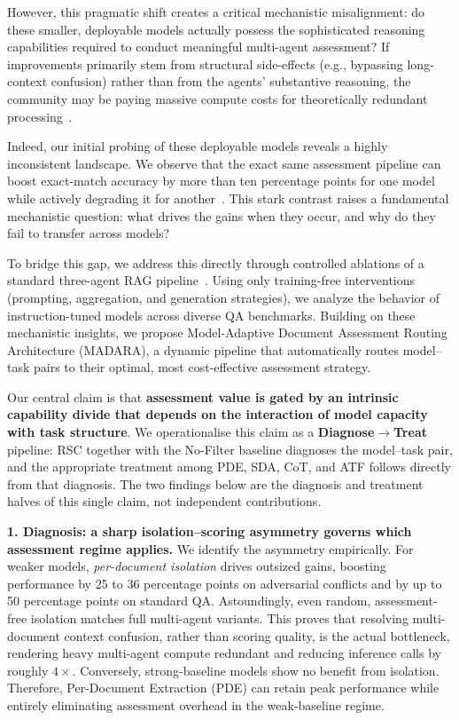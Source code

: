 \documentclass[11pt]{article}
\theoremstyle{definition}
\begin{document}
However, this pragmatic shift creates a critical mechanistic misalignment: do these smaller, deployable models actually possess the sophisticated reasoning capabilities required to conduct meaningful multi-agent assessment? If improvements primarily stem from structural side-effects (e.g., bypassing long-context confusion) rather than from the agents' substantive reasoning, the community may be paying massive compute costs for theoretically redundant processing~\cite{liu2024lost}.

Indeed, our initial probing of these deployable models reveals a highly inconsistent landscape. We observe that the exact same assessment pipeline can boost exact-match accuracy by more than ten percentage points for one model while actively degrading it for another~\cite{luo2025zero, gao2026u, du2025context}. This stark contrast raises a fundamental mechanistic question: what drives the gains when they occur, and why do they fail to transfer across models?


To bridge this gap, we address this directly through controlled ablations of a standard three-agent RAG pipeline~\citep{chang2025main}. Using only training-free interventions (prompting, aggregation, and generation strategies), we analyze the behavior of instruction-tuned models across diverse QA benchmarks. Building on these mechanistic insights, we propose Model-Adaptive Document Assessment Routing Architecture (MADARA), a dynamic pipeline that automatically routes model--task pairs to their optimal, most cost-effective assessment strategy.

Our central claim is that \textbf{assessment value is gated by an intrinsic capability divide that depends on the interaction of model capacity with task structure}. We operationalise this claim as a \textbf{Diagnose$\to$Treat} pipeline: RSC together with the No-Filter baseline diagnoses the model--task pair, and the appropriate treatment among PDE, SDA, CoT, and ATF follows directly from that diagnosis. The two findings below are the diagnosis and treatment halves of this single claim, not independent contributions.

\noindent\textbf{1. Diagnosis: a sharp isolation--scoring asymmetry governs which assessment regime applies.} We identify the asymmetry empirically. For weaker models, \emph{per-document isolation} drives outsized gains, boosting performance by 25 to 36 percentage points on adversarial conflicts and by up to 50 percentage points on standard QA. Astoundingly, even random, assessment-free isolation matches full multi-agent variants. This proves that resolving multi-document context confusion, rather than scoring quality, is the actual bottleneck, rendering heavy multi-agent compute redundant and reducing inference calls by roughly \(4\times\). Conversely, strong-baseline models show no benefit from isolation. Therefore, Per-Document Extraction (PDE) can retain peak performance while entirely eliminating assessment overhead in the weak-baseline regime.
\end{document}
